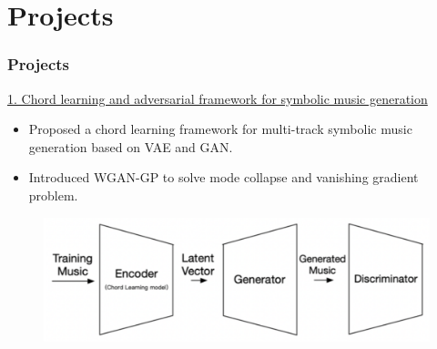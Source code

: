\documentclass{beamer}
\begin{document}
\section{Projects}
\begin{frame}
    \frametitle{Projects}
    \begin{block}{\href{https://docs.google.com/presentation/d/1ge2It3UsAvTwpAk-9LUnmiz7dRqJnpFX/edit?usp=sharing&ouid=101248488395326982475&rtpof=true&sd=true}{1. Chord learning and adversarial framework for symbolic music generation}}
        \begin{itemize}
            \item Proposed a chord learning framework for multi-track symbolic music generation based on VAE and GAN.
            \item Introduced WGAN-GP to solve mode collapse and vanishing gradient problem.
        \end{itemize}

        \begin{figure}[H]
            \centering
            \includegraphics[scale=0.4]{img/srtp-arch.png}
        \end{figure}
    \end{block}
\end{frame}
\end{document}
